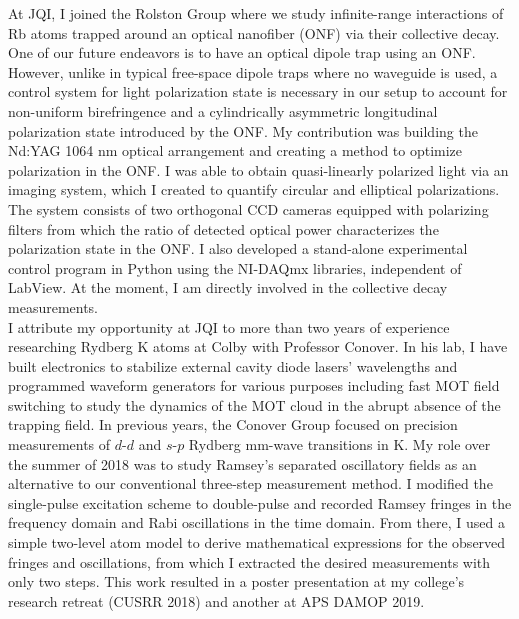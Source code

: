 \documentclass[12pt]{article}
\begin{document}
At JQI, I joined the Rolston Group where we study infinite-range interactions of Rb atoms trapped around an optical nanofiber (ONF) via their collective decay. One of our future endeavors is to have an optical dipole trap using an ONF. However, unlike in typical free-space dipole traps where no waveguide is used, a control system for light polarization state is necessary in our setup to account for non-uniform birefringence and a cylindrically asymmetric longitudinal polarization state introduced by the ONF. My contribution was building the Nd:YAG 1064 nm optical arrangement and creating a method to optimize polarization in the ONF. I was able to obtain quasi-linearly polarized light via an imaging system, which I created to quantify circular and elliptical polarizations. The system consists of two orthogonal CCD cameras equipped with polarizing filters from which the ratio of detected optical power characterizes the polarization state in the ONF. I also developed a stand-alone experimental control program in Python using the NI-DAQmx libraries, independent of LabView. At the moment, I am directly involved in the collective decay measurements. \\ 

I attribute my opportunity at JQI to more than two years of experience researching Rydberg K atoms at Colby with Professor  Conover. In his lab, I have built electronics to stabilize external cavity diode lasers' wavelengths and programmed waveform generators for various purposes including fast MOT field switching to study the dynamics of the MOT cloud in the abrupt absence of the trapping field. In previous years, the Conover Group focused on precision measurements of $d$-$d$ and $s$-$p$ Rydberg mm-wave transitions in K. My role over the summer of 2018 was to study Ramsey's separated oscillatory fields as an alternative to our conventional three-step measurement method. I modified the single-pulse excitation scheme to double-pulse and recorded Ramsey fringes in the frequency domain and Rabi oscillations in the time domain. From there, I used a simple two-level atom model to derive mathematical expressions for the observed fringes and oscillations, from which I extracted the desired measurements with only two steps. This work resulted in a poster presentation at my college's research retreat (CUSRR 2018) and another at APS DAMOP 2019.  \\
\end{document}
